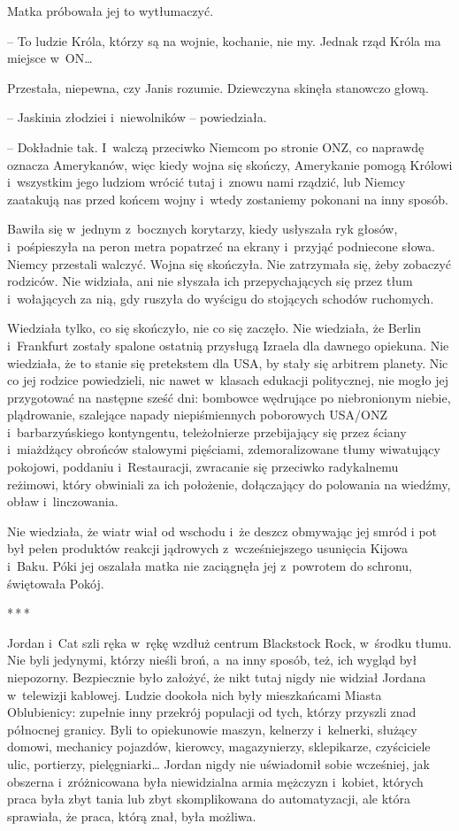 \documentclass[oneside,polish,11pt,sfheadings]{mwbk}
\newcommand{\threeast}{\bigskip\par\centerline{*\,*\,*}\medskip\par}%
\begin{document}
Matka próbowała jej to wytłumaczyć. 

-- To ludzie Króla, którzy są na
wojnie, kochanie, nie my. Jednak rząd Króla ma miejsce w~ON\ldots

Przestała, niepewna, czy Janis rozumie. Dziewczyna skinęła stanowczo
głową. 

-- Jaskinia złodziei i~niewolników -- powiedziała.

-- Dokładnie tak. I~walczą przeciwko Niemcom po stronie ONZ, co naprawdę
oznacza Amerykanów, więc kiedy wojna się skończy, Amerykanie pomogą
Królowi i~wszystkim jego ludziom wrócić tutaj i~znowu nami rządzić, lub
Niemcy zaatakują nas przed końcem wojny i~wtedy zostaniemy pokonani na
inny sposób.

Bawiła się w~jednym z~bocznych korytarzy, kiedy usłyszała ryk głosów, i~pośpieszyła na peron metra popatrzeć na ekrany i~przyjąć podniecone
słowa. Niemcy przestali walczyć. Wojna się skończyła. Nie zatrzymała
się, żeby zobaczyć rodziców. Nie widziała, ani nie słyszała ich
przepychających się przez tłum i~wołających za nią, gdy ruszyła do
wyścigu do stojących schodów ruchomych.

Wiedziała tylko, co się skończyło, nie co się zaczęło. Nie wiedziała, że
Berlin i~Frankfurt zostały spalone ostatnią przysługą Izraela dla
dawnego opiekuna. Nie wiedziała, że to stanie się pretekstem dla USA, by
stały się arbitrem planety. Nic co jej rodzice powiedzieli, nic nawet w~klasach edukacji politycznej, nie mogło jej przygotować na następne
sześć dni: bombowce wędrujące po niebronionym niebie, plądrowanie,
szalejące napady niepiśmiennych poborowych USA/ONZ i~barbarzyńskiego
kontyngentu, teleżołnierze przebijający się przez ściany i~miażdżący
obrońców stalowymi pięściami, zdemoralizowane tłumy wiwatujący pokojowi,
poddaniu i~Restauracji, zwracanie się przeciwko radykalnemu reżimowi,
który obwiniali za ich położenie, dołączający do polowania na wiedźmy,
obław i~linczowania.

Nie wiedziała, że wiatr wiał od wschodu i~że deszcz obmywając jej smród
i pot był pełen produktów reakcji jądrowych z~wcześniejszego usunięcia
Kijowa i~Baku. Póki jej oszalała matka nie zaciągnęła jej z~powrotem do
schronu, świętowała Pokój.
  \threeast 

Jordan i~Cat szli ręka w~rękę wzdłuż centrum Blackstock Rock, w~środku
tłumu. Nie byli jedynymi, którzy nieśli broń, a~na inny sposób, też, ich
wygląd był niepozorny. Bezpiecznie było założyć, że nikt tutaj nigdy nie
widział Jordana w~telewizji kablowej. Ludzie dookoła nich były
mieszkańcami Miasta Oblubienicy: zupełnie inny przekrój populacji od
tych, którzy przyszli znad północnej granicy. Byli to opiekunowie maszyn,
kelnerzy i~kelnerki, służący domowi, mechanicy pojazdów, kierowcy,
magazynierzy, sklepikarze, czyściciele ulic, portierzy, pielęgniarki\ldots
Jordan nigdy nie uświadomił sobie wcześniej, jak obszerna i~zróżnicowana
była niewidzialna armia mężczyzn i~kobiet, których praca była zbyt tania
lub zbyt skomplikowana do automatyzacji, ale która sprawiała, że praca,
którą znał, była możliwa.
\end{document}
